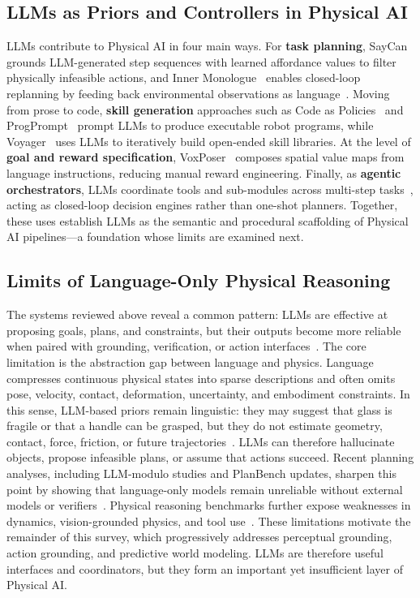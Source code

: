 \subsection{LLMs as Priors and Controllers in Physical AI}

LLMs contribute to Physical AI in four main ways.
For \textbf{task planning}, SayCan~\citep{ahn2022saycan} grounds LLM-generated step sequences with learned affordance values to filter physically infeasible actions, and Inner Monologue~\citep{huang2022innermonologue} enables closed-loop replanning by feeding back environmental observations as language~\citep{huang2022zeroshotplanners}.
Moving from prose to code, \textbf{skill generation} approaches such as Code as Policies~\citep{liang2023codeaspolicies} and ProgPrompt~\citep{singh2023progprompt} prompt LLMs to produce executable robot programs, while Voyager~\citep{wang2023voyager} uses LLMs to iteratively build open-ended skill libraries.
At the level of \textbf{goal and reward specification}, VoxPoser~\citep{huang2023voxposer} composes spatial value maps from language instructions, reducing manual reward engineering.
Finally, as \textbf{agentic orchestrators}, LLMs coordinate tools and sub-modules across multi-step tasks~\citep{rana2023sayplan,hua2024gensim2}, acting as closed-loop decision engines rather than one-shot planners.
Together, these uses establish LLMs as the semantic and procedural scaffolding of Physical AI pipelines---a foundation whose limits are examined next.

\subsection{Limits of Language-Only Physical Reasoning}

The systems reviewed above reveal a common pattern: LLMs are effective at proposing goals, plans, and constraints, but their outputs become more reliable when paired with grounding, verification, or action interfaces~\citep{ahn2022saycan,huang2022innermonologue,rana2023sayplan}. 
The core limitation is the abstraction gap between language and physics. 
Language compresses continuous physical states into sparse descriptions and often omits pose, velocity, contact, deformation, uncertainty, and embodiment constraints. 
In this sense, LLM-based priors remain linguistic: they may suggest that glass is fragile or that a handle can be grasped, but they do not estimate geometry, contact, force, friction, or future trajectories~\citep{qiu2025phybench,xu2025physense}. 
LLMs can therefore hallucinate objects, propose infeasible plans, or assume that actions succeed.
Recent planning analyses, including LLM-modulo studies and PlanBench updates, sharpen this point by showing that language-only models remain unreliable without external models or verifiers~\citep{kambhampati2024llmscantplan,valmeekam2024planbench}. 
Physical reasoning benchmarks further expose weaknesses in dynamics, vision-grounded physics, and tool use~\citep{xiang2025seephys,zhang2025phystoolbench}. 
These limitations motivate the remainder of this survey, which progressively addresses perceptual grounding, action grounding, and predictive world modeling.
LLMs are therefore useful interfaces and coordinators, but they form an important yet insufficient layer of Physical AI.
